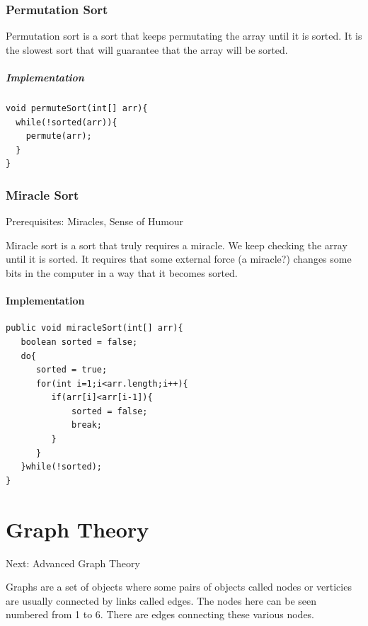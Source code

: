 \documentclass[11pt,oneside]{book}
\begin{document}
        \section{ Permutation Sort }
        

Permutation sort is a sort that keeps permutating the array until it is sorted. It is the slowest sort that will guarantee that the array will be sorted.

\subsubsection{Implementation}

\begin{lstlisting}
void permuteSort(int[] arr){
  while(!sorted(arr)){
    permute(arr);
  }
}
\end{lstlisting}

        \section{ Miracle Sort }
        

Prerequisites: Miracles, Sense of Humour

Miracle sort is a sort that truly requires a miracle. We keep checking the array until it is sorted. It requires that some external force (a miracle?) changes some bits in the computer in a way that it becomes sorted.

\subsection{Implementation}

\begin{lstlisting}
public void miracleSort(int[] arr){
   boolean sorted = false;
   do{
      sorted = true;
      for(int i=1;i<arr.length;i++){
         if(arr[i]<arr[i-1]){
             sorted = false;
             break;
         }
      }
   }while(!sorted);
}
\end{lstlisting}

\part{ Graph Theory }
    

Next: Advanced Graph Theory

Graphs are a set of objects where some pairs of objects  called nodes or verticies are usually connected by links called edges. The nodes here can be seen numbered from 1 to 6. There are edges connecting these various nodes.
\end{document}
